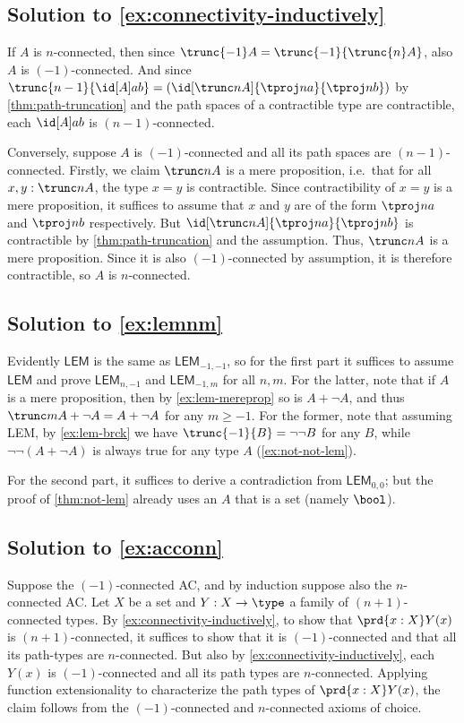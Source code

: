 \documentclass[
%
%
11pt %
]{article}
\begin{document}
\subsection*{Solution to \cref{ex:connectivity-inductively}}

If $A$ is $n$-connected, then since $\trunc{-1}A = \trunc{-1}{\trunc{n}A}$, also $A$ is $(-1)$-connected.
And since $\trunc{n-1}{\id[A]ab} = (\id[\trunc n A]{\tproj na}{\tproj nb})$ by \cref{thm:path-truncation} and the path spaces of a contractible type are contractible, each $\id[A]ab$ is $(n-1)$-connected.

Conversely, suppose $A$ is $(-1)$-connected and all its path spaces are $(n-1)$-connected.
Firstly, we claim $\trunc nA$ is a mere proposition, i.e.\ that for all $x,y:\trunc nA$, the type $x=y$ is contractible.
Since contractibility of $x=y$ is a mere proposition, it suffices to assume that $x$ and $y$ are of the form $\tproj na$ and $\tproj nb$ respectively.
But $\id[\trunc n A]{\tproj na}{\tproj nb}$ is contractible by \cref{thm:path-truncation} and the assumption.
Thus, $\trunc nA$ is a mere proposition.
Since it is also $(-1)$-connected by assumption, it is therefore contractible, so $A$ is $n$-connected.


\subsection*{Solution to \cref{ex:lemnm}}

Evidently $\mathsf{LEM}$ is the same as $\mathsf{LEM}_{-1,-1}$, so for the first part it suffices to assume $\mathsf{LEM}$ and prove $\mathsf{LEM}_{n,-1}$ and $\mathsf{LEM}_{-1,m}$ for all $n,m$.
For the latter, note that if $A$ is a mere proposition, then by \cref{ex:lem-mereprop} so is $A+\neg A$, and thus $\trunc m{A+\neg A}= A+\neg A$ for any $m\ge -1$.
For the former, note that assuming LEM, by \cref{ex:lem-brck} we have $\trunc{-1}{B} = \neg\neg B$ for any $B$, while $\neg\neg(A+\neg A)$ is always true for any type $A$ (\cref{ex:not-not-lem}).

For the second part, it suffices to derive a contradiction from $\mathsf{LEM}_{0,0}$; but the proof of \cref{thm:not-lem} already uses an $A$ that is a set (namely $\bool$).

\subsection*{Solution to \cref{ex:acconn}}

Suppose the $(-1)$-connected AC, and by induction suppose also the $n$-connected AC.
Let $X$ be a set and $Y:X\to \type$ a family of $(n+1)$-connected types.
By \cref{ex:connectivity-inductively}, to show that $\prd{x:X} Y(x)$ is $(n+1)$-connected, it suffices to show that it is $(-1)$-connected and that all its path-types are $n$-connected.
But also by \cref{ex:connectivity-inductively}, each $Y(x)$ is $(-1)$-connected and all its path types are $n$-connected.
Applying function extensionality to characterize the path types of $\prd{x:X} Y(x)$, the claim follows from the $(-1)$-connected and $n$-connected axioms of choice.
\end{document}
